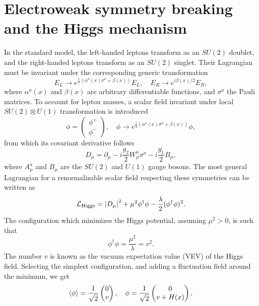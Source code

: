 \section{Electroweak symmetry breaking and the Higgs mechanism} \label{sect:Higgs-mechanism}
In the standard model, the left-handed leptons transform as an $SU(2)$ doublet, and the right-handed leptons transform as an $SU(2)$ singlet. Their Lagrangian must be invariant under the corresponding generic transformation
\begin{equation}
    \label{eq:2.1}
    E_L \rightarrow e^{\frac{i}{2}\left( \alpha^a(x)\sigma^a + \beta(x) \right)}E_L, \quad E_R\rightarrow e^{i\beta(x)/2}E_R,
\end{equation}
where $\alpha^a(x)$ and $\beta(x)$ are arbitrary differentiable functions, and $\sigma^a$ the Pauli matrices. To account for lepton masses, a scalar field invariant under local $SU(2)\otimes U(1)$ transformation is introduced
\begin{equation}
    \label{eq:2.2}
    \phi=\begin{pmatrix}
        \phi^+ \\ \phi^-
    \end{pmatrix}, \quad \phi\rightarrow e^{\frac{i}{2}\left( \alpha^a(x)\sigma^a + \beta(x) \right)} \phi,
\end{equation}
from which its covariant derivative follows
\begin{equation}
    \label{eq:2.3}
    D_{\mu} = \partial_{\mu} - i \frac{g_2}{2}W^a_{\mu} \sigma^a - i\frac{g_1}{2}B_{\mu},
\end{equation}
where $A^{a}_{\mu}$ and $B_{\mu}$ are the $SU(2)$ and $U(1)$ gauge bosons. The most general Lagrangian for a renormalizable scalar field respecting these symmetries can be written as
\begin{equation}
    \label{eq:2.4}
    \mathcal{L}_{\mathrm{Higgs}} = \abs{D_{\mu}}^2 + \mu^2\phi^{\dagger}\phi - \frac{\lambda}{2} (\phi^{\dagger}\phi)^2.
\end{equation}
The configuration which minimizes the Higgs potential, assuming $\mu^2 >0$, is such that 
\begin{equation}
    \label{eq:2.5}
    \phi^{\dagger}\phi = \frac{\mu^2}{\lambda} = v^2.
\end{equation}
The number $v$ is known as the vacuum expectation value (VEV) of the Higgs field. Selecting the simplest configuration, and adding a fluctuation field around the minimum, we get
\begin{equation}
    \label{eq:2.6}
    \expval{\phi} = \frac{1}{\sqrt{2}}\begin{pmatrix}
        0 \\ v
    \end{pmatrix}, \quad \phi = \frac{1}{\sqrt{2}}\begin{pmatrix}
        0 \\ v + H(x)
    \end{pmatrix},
\end{equation}

